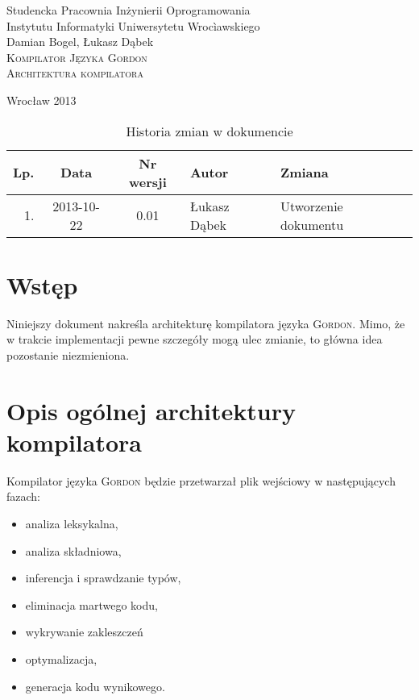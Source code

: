 \documentclass{documentation}
\begin{document}
\begin{titlepage}
\begin{center}
Studencka Pracownia Inżynierii Oprogramowania\\
Instytutu Informatyki Uniwersytetu Wrocìawskiego\\[6cm]

Damian Bogel, Łukasz Dąbek\\[1cm]
\textsc{\LARGE Kompilator Języka Gordon}\\[0.5cm]
\textsc{\large Architektura kompilatora}

\vfill
Wrocław 2013 \\[2.5cm]

\end{center}
\end{titlepage}

\newpage
\begin{table}
	\centering
	\caption{Historia zmian w dokumencie}
		\begin{tabular}{|r|c|c|l|l|}
		\hline
		Lp.  & Data       & Nr wersji & Autor                 & Zmiana \\ \hline
		1.   & 2013-10-22 & 0.01 & Łukasz Dąbek & Utworzenie dokumentu \\ \hline
	\end{tabular}
\end{table}
\newpage

\tableofcontents
\setcounter{page}{2}

\newpage

\section{Wstęp}
Niniejszy dokument nakreśla architekturę kompilatora języka \textsc{Gordon}. Mimo, że
w trakcie implementacji pewne szczegóły mogą ulec zmianie, to główna idea pozostanie
niezmieniona.

\section{Opis ogólnej architektury kompilatora}
Kompilator języka \textsc{Gordon} będzie przetwarzał plik wejściowy w następujących fazach:
\begin{itemize}
    \item analiza leksykalna,
    \item analiza składniowa,
    \item inferencja i sprawdzanie typów,
    \item eliminacja martwego kodu,
    \item wykrywanie zakleszczeń
    \item optymalizacja,
    \item generacja kodu wynikowego.
\end{itemize}
\end{document}

